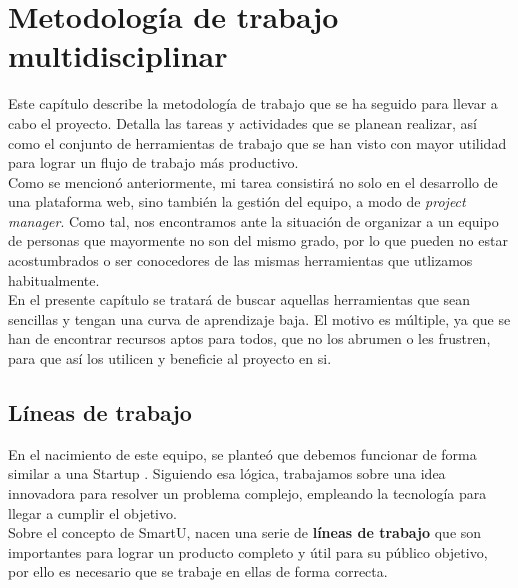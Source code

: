 \chapter{Metodología de trabajo multidisciplinar}
\label{ch:metodologia}

Este capítulo describe la metodología de trabajo que se ha seguido para llevar a cabo el proyecto. Detalla las tareas y actividades que se planean realizar, así como el conjunto de herramientas de trabajo que se han visto con mayor utilidad para lograr un flujo de trabajo más productivo.\\

Como se mencionó anteriormente, mi tarea consistirá no solo en el desarrollo de una plataforma web, sino también la gestión del equipo, a modo de \textit{project manager}. Como tal, nos encontramos ante la situación de organizar a un equipo de personas que mayormente no son del mismo grado, por lo que pueden no estar acostumbrados o ser conocedores de las mismas herramientas que utlizamos habitualmente.\\

En el presente capítulo se tratará de buscar aquellas herramientas que sean sencillas y tengan una curva de aprendizaje baja. El motivo es múltiple, ya que se han de encontrar recursos aptos para todos, que no los abrumen o les frustren, para que así los utilicen y beneficie al proyecto en si.

\section{Líneas de trabajo}
En el nacimiento de este equipo, se planteó que debemos funcionar de forma similar a una Startup \cite{startup}. Siguiendo esa lógica, trabajamos sobre una idea innovadora para resolver un problema complejo, empleando la tecnología para llegar a cumplir el objetivo.\\

Sobre el concepto de SmartU, nacen una serie de \textbf{líneas de trabajo} que son importantes para lograr un producto completo y útil para su público objetivo, por ello es necesario que se trabaje en ellas de forma correcta.

